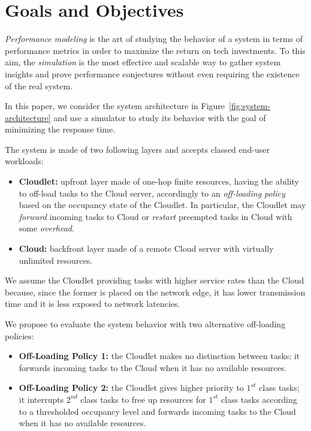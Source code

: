 \section{Goals and Objectives}
\label{sec:performance-modeling-goals-and-objectives}
\textit{Performance modeling} is the art of studying the behavior of a system in terms of performance metrics in order to maximize the return on tech investments.
To this aim, the \textit{simulation} is the most effective and scalable way to gather system insights and prove performance conjectures without even requiring the existence of the real system.

In this paper, we consider the system architecture in Figure~\ref{fig:system-architecture} and use a simulator to study its behavior with the goal of minimizing the response time.

The system is made of two following layers and accepts classed end-user workloads:

\begin{itemize}
		\item \textbf{Cloudlet:} upfront layer made of one-hop finite resources, having the ability to off-load tasks to the Cloud server, accordingly to an \textit{off-loading policy} based on the occupancy state of the Cloudlet. In particular, the Cloudlet may \textit{forward} incoming tasks to Cloud or \textit{restart} preempted tasks in Cloud with some \textit{overhead}. 
		
		\item \textbf{Cloud:} backfront layer made of a remote Cloud server with virtually unlimited resources.
\end{itemize}

We assume the Cloudlet  providing tasks with higher service rates than the Cloud because, since the former is placed on the network edge, it has lower transmission time and it is less exposed to network latencies.

We propose to evaluate the system behavior with two alternative off-loading policies:

\begin{itemize}
	\item \textbf{Off-Loading Policy 1:} the Cloudlet makes no distinction between tasks; it forwards incoming tasks to the Cloud when it has no available resources.
	
	\item \textbf{Off-Loading Policy 2:} the Cloudlet gives higher priority to $1^{st}$ class tasks; it interrupts $2^{nd}$ class tasks to free up resources for $1^{st}$ class tasks according to a thresholded occupancy level and forwards incoming tasks to the Cloud when it has no available resources.
\end{itemize}

